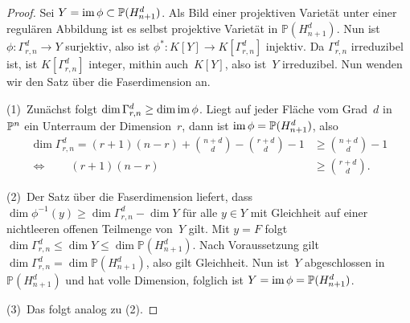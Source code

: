 \begin{proof}
Sei $Y = \operatorname{im} \phi \subset \mathbb P(H_{n+1}^d)$. Als Bild einer projektiven Varietät unter einer regulären Abbildung ist es selbst projektive Varietät in $\mathbb P(H_{n+1}^d)$. Nun ist $\phi \colon \Gamma_{r,n}^d \to Y$ surjektiv, also ist $\phi^* \colon K[Y] \to K[\Gamma_{r,n}^d]$ injektiv. Da $\Gamma_{r,n}^d$ irreduzibel ist, ist $K[\Gamma_{r,n}^d]$ integer, mithin auch~$K[Y]$, also ist~$Y$ irreduzibel. Nun wenden wir den Satz über die Faserdimension an.

(1)~Zunächst folgt $\dim \Gamma_{r,n}^d \geq \dim \operatorname{im} \phi$. Liegt auf jeder Fläche vom Grad~$d$ in~$\mathbb P^{n}$ ein Unterraum der Dimension~$r$, dann ist $\operatorname{im} \phi = \mathbb P(H_{n+1}^d)$, also
\begin{align*}
\dim \Gamma_{r,n}^d = (r+1)(n-r) + \binom{n+d}d - \binom{r+d}d - 1 &\geq \binom{n+d}d - 1 \\
\Leftrightarrow \qquad (r+1)(n-r) &\geq \binom{r+d}d.
\end{align*}

(2)~Der Satz über die Faserdimension liefert, dass $\dim \phi^{-1}(y) \geq \dim \Gamma_{r,n}^d - \dim Y$ für alle $y \in Y$ mit Gleichheit auf einer nichtleeren offenen Teilmenge von~$Y$ gilt. Mit $y = F$ folgt $\dim \Gamma_{r,n}^d \leq \dim Y \leq \dim \mathbb P(H_{n+1}^d)$. Nach Voraussetzung gilt $\dim \Gamma_{r,n}^d = \dim \mathbb P(H_{n+1}^d)$, also gilt Gleichheit. Nun ist~$Y$ abgeschlossen in $\mathbb P(H_{n+1}^d)$ und hat volle Dimension, folglich ist $Y = \operatorname{im} \phi = \mathbb P(H_{n+1}^d)$.

(3)~Das folgt analog zu (2).
\end{proof}

